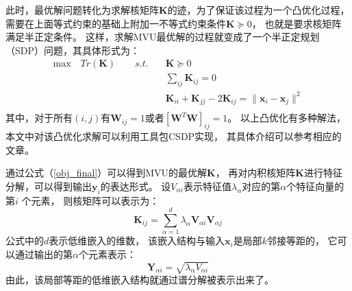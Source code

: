 此时，最优解问题转化为求解核矩阵$\mathbf{K}$的迹，为了保证该过程为一个凸优化过程，
需要在上面等式约束的基础上附加一不等式约束条件$\mathbf{K}\succeq 0$，
也就是要求核矩阵满足半正定条件。
这样，求解MVU最优解的过程就变成了一个半正定规划（SDP）问题，其具体形式为：
\begin{equation}
\label{obj_final}
\begin{split}
\mathrm{max}\quad Tr(\mathbf{K}) \quad\quad s.t.\quad& \mathbf{K}\succeq 0  \\
& \sum_{ij}\mathbf{K}_{ij}=0  \\
&\mathbf{K}_{ii}+\mathbf{K}_{jj}-2\mathbf{K}_{ij}
=\|\textbf{x}_i-\textbf{x}_j\|^2 \\
\end{split}
\end{equation}
其中，对于所有$(i,j)$有$\mathbf{W}_{ij}=1$或者$[\mathbf{W}^T\mathbf{W}]_{ij}=1$。
以上凸优化有多种解法，本文中对该凸优化求解可以利用工具包CSDP实现，
其具体介绍可以参考相应的文章。

通过公式（\ref{obj_final}）可以得到MVU的最优解$\mathbf{K}$，
再对内积核矩阵$\mathbf{K}$进行特征分解，可以得到输出$\mathbf{y}_i$的表达形式。
设$V_{\alpha i}$表示特征值$\lambda_{\alpha}$对应的第$\alpha$个特征向量的第$i$ 个元素，
则核矩阵可以表示为：
\begin{equation}
\label{diag}
\mathbf{K}_{ij}=\sum_{\alpha=1}^{d}\lambda_{\alpha}\mathbf{V}_{\alpha i}\mathbf{V}_{\alpha j}
\end{equation}
公式中的$d$表示低维嵌入的维数，
该嵌入结构与输入$\mathbf{x}_{i}$是局部$k$邻接等距的，
它可以通过输出的第$\alpha$个元素表示：
\begin{equation}
\label{output}
\mathbf{Y}_{\alpha i}=\sqrt{\lambda_{\alpha}V_{\alpha i}}
\end{equation}
由此，该局部等距的低维嵌入结构就通过谱分解被表示出来了。

